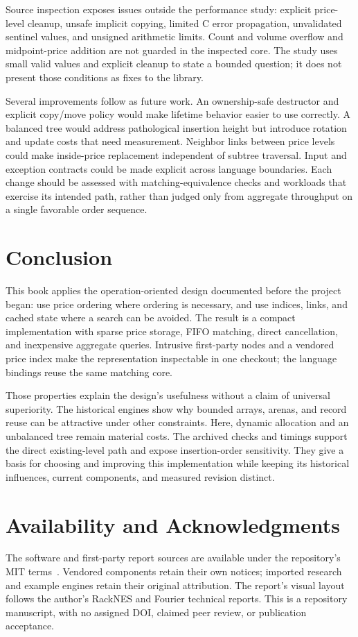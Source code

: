 \documentclass[10pt,letterpaper,twocolumn]{article}
\begin{document}
Source inspection exposes issues outside the performance study: explicit
price-level cleanup, unsafe implicit copying, limited C error propagation,
unvalidated sentinel values, and unsigned arithmetic limits. Count and volume
overflow and midpoint-price addition are not guarded in the inspected core.
The study uses small valid values and explicit cleanup to state a bounded
question; it does not present those conditions as fixes to the library.

Several improvements follow as future work. An ownership-safe destructor and
explicit copy/move policy would make lifetime behavior easier to use correctly.
A balanced tree would address pathological insertion height but introduce
rotation and update costs that need measurement. Neighbor links between price
levels could make inside-price replacement independent of subtree traversal.
Input and exception contracts could be made explicit across language boundaries.
Each change should be assessed with matching-equivalence checks and workloads
that exercise its intended path, rather than judged only from aggregate
throughput on a single favorable order sequence.

\section{Conclusion}
This book applies the operation-oriented design documented before the
project began: use price ordering where ordering is necessary, and use
indices, links, and cached state where a search can be avoided. The result
is a compact implementation with sparse price storage, FIFO matching,
direct cancellation, and inexpensive aggregate queries. Intrusive first-party
nodes and a vendored price index make the representation inspectable in one
checkout; the language bindings reuse the same matching core.

Those properties explain the design's usefulness without a claim of universal
superiority. The historical engines show why bounded arrays, arenas, and
record reuse can be attractive under other constraints. Here, dynamic
allocation and an unbalanced tree remain material costs. The archived checks
and timings support the direct existing-level path and expose insertion-order
sensitivity. They give a basis for choosing and improving this implementation
while keeping its historical influences, current components, and measured
revision distinct.

\section*{Availability and Acknowledgments}
The software and first-party report sources are available under the
repository's MIT terms~\cite{kauten-limit-order-book-2019}. Vendored components retain their own
notices; imported research and example engines retain their original
attribution. The report's visual layout follows the author's RackNES and
Fourier technical reports. This is a repository manuscript, with no assigned
DOI, claimed peer review, or publication acceptance.
\end{document}
